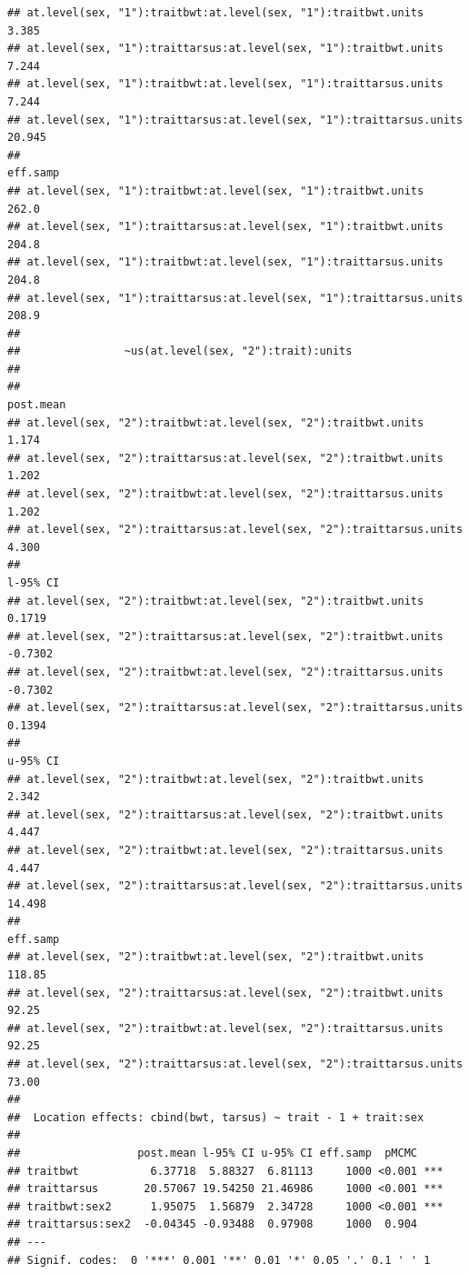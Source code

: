 \documentclass[
  12pt,
]{book}
\begin{document}
\begin{verbatim}
## at.level(sex, "1"):traitbwt:at.level(sex, "1"):traitbwt.units          3.385
## at.level(sex, "1"):traittarsus:at.level(sex, "1"):traitbwt.units       7.244
## at.level(sex, "1"):traitbwt:at.level(sex, "1"):traittarsus.units       7.244
## at.level(sex, "1"):traittarsus:at.level(sex, "1"):traittarsus.units   20.945
##                                                                     eff.samp
## at.level(sex, "1"):traitbwt:at.level(sex, "1"):traitbwt.units          262.0
## at.level(sex, "1"):traittarsus:at.level(sex, "1"):traitbwt.units       204.8
## at.level(sex, "1"):traitbwt:at.level(sex, "1"):traittarsus.units       204.8
## at.level(sex, "1"):traittarsus:at.level(sex, "1"):traittarsus.units    208.9
## 
##                ~us(at.level(sex, "2"):trait):units
## 
##                                                                     post.mean
## at.level(sex, "2"):traitbwt:at.level(sex, "2"):traitbwt.units           1.174
## at.level(sex, "2"):traittarsus:at.level(sex, "2"):traitbwt.units        1.202
## at.level(sex, "2"):traitbwt:at.level(sex, "2"):traittarsus.units        1.202
## at.level(sex, "2"):traittarsus:at.level(sex, "2"):traittarsus.units     4.300
##                                                                     l-95% CI
## at.level(sex, "2"):traitbwt:at.level(sex, "2"):traitbwt.units         0.1719
## at.level(sex, "2"):traittarsus:at.level(sex, "2"):traitbwt.units     -0.7302
## at.level(sex, "2"):traitbwt:at.level(sex, "2"):traittarsus.units     -0.7302
## at.level(sex, "2"):traittarsus:at.level(sex, "2"):traittarsus.units   0.1394
##                                                                     u-95% CI
## at.level(sex, "2"):traitbwt:at.level(sex, "2"):traitbwt.units          2.342
## at.level(sex, "2"):traittarsus:at.level(sex, "2"):traitbwt.units       4.447
## at.level(sex, "2"):traitbwt:at.level(sex, "2"):traittarsus.units       4.447
## at.level(sex, "2"):traittarsus:at.level(sex, "2"):traittarsus.units   14.498
##                                                                     eff.samp
## at.level(sex, "2"):traitbwt:at.level(sex, "2"):traitbwt.units         118.85
## at.level(sex, "2"):traittarsus:at.level(sex, "2"):traitbwt.units       92.25
## at.level(sex, "2"):traitbwt:at.level(sex, "2"):traittarsus.units       92.25
## at.level(sex, "2"):traittarsus:at.level(sex, "2"):traittarsus.units    73.00
## 
##  Location effects: cbind(bwt, tarsus) ~ trait - 1 + trait:sex 
## 
##                  post.mean l-95% CI u-95% CI eff.samp  pMCMC    
## traitbwt           6.37718  5.88327  6.81113     1000 <0.001 ***
## traittarsus       20.57067 19.54250 21.46986     1000 <0.001 ***
## traitbwt:sex2      1.95075  1.56879  2.34728     1000 <0.001 ***
## traittarsus:sex2  -0.04345 -0.93488  0.97908     1000  0.904    
## ---
## Signif. codes:  0 '***' 0.001 '**' 0.01 '*' 0.05 '.' 0.1 ' ' 1
\end{verbatim}
\end{document}
